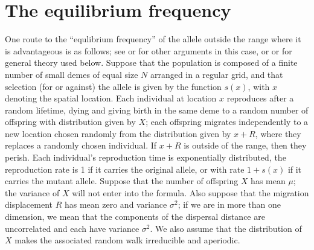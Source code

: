 \documentclass{article}
\begin{document}
\section{The equilibrium frequency}
\label{apx:eqfreq}

One route to the ``equlibrium frequency'' of the allele outside the range where it is advantageous is as follows;
see \citet{slatkin1973geneflow} or \citet{barton1987establishment,pollak1966survival} for other arguments in this case, 
or \citet{etheridge2000introduction} or \citet{dawson1993measurevalued} for general theory used below.
Suppose that the population is composed of a finite number of small demes of equal size $N$ arranged in a regular grid,
and that selection (for or against) the allele is given by the function $s(x)$, with $x$ denoting the spatial location.
Each individual at location $x$ reproduces after a random lifetime,
dying and giving birth in the same deme to a random number of offspring with distribution given by $X$;
each offspring migrates independently to a new location chosen randomly from the distribution given by $x+R$,
where they replaces a randomly chosen individual.
If $x+R$ is outside of the range, then they perish.
Each individual's reproduction time is exponentially distributed, 
the reproduction rate is 1 if it carries the original allele, or with rate $1+s(x)$ if it carries the mutant allele.
Suppose that the number of offspring $X$ has mean $\mu$; the variance of $X$ will not enter into the formula.
Also suppose that the migration displacement $R$ has mean zero and variance $\sigma^2$;
if we are in more than one dimension, we mean that the components of the dispersal distance are uncorrelated
and each have variance $\sigma^2$.
We also assume that the distribution of $X$ makes the associated random walk irreducible and aperiodic.
\end{document}
